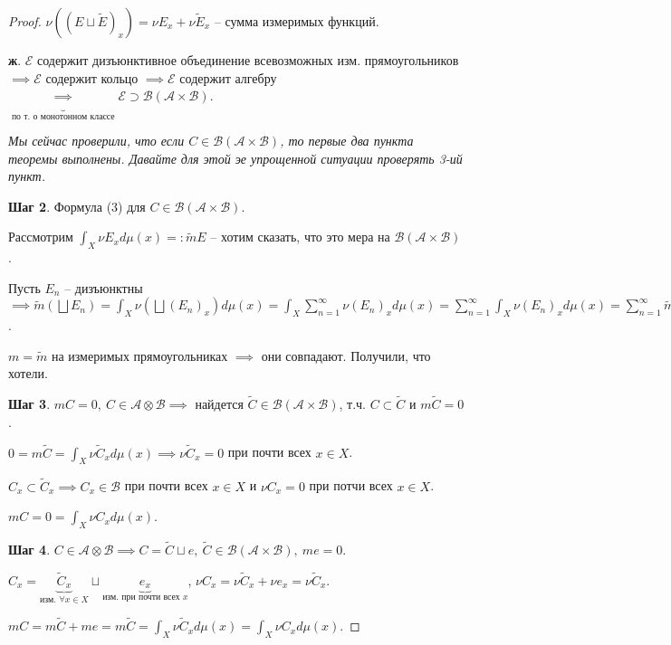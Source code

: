 \begin{proof}
    $\nu \left( (E \sqcup \tilde{E})_x \right) = \nu E_x + \nu \tilde{E}_x$ -- сумма измеримых функций.

    \textbf{ж}. $\mathcal{E}$ содержит дизъюнктивное объединение всевозможных изм. прямоугольников $\implies \mathcal{E}$ содержит кольцо $\implies \mathcal{E}$ содержит алгебру $\underbrace{\implies}_{\text{по т. о монотонном классе}} \mathcal{E} \supset \mathscr{B}(\mathcal{A} \times \mathcal{B})$.

    \textit{Мы сейчас проверили, что если $C \in \mathscr{B}(\mathcal{A} \times \mathcal{B})$, то первые два пункта теоремы выполнены. Давайте для этой эе упрощенной ситуации проверять 3-ий пункт.}
    
    \textbf{Шаг 2}. Формула (3) для $C \in \mathscr{B}(\mathcal{A} \times \mathcal{B})$.

    Рассмотрим $\int_X{\nu E_x d \mu(x) =: \tilde{m} E}$ -- хотим сказать, что это мера на $\mathscr{B}(\mathcal{A} \times \mathcal{B})$.

    Пусть $E_n$ -- дизъюнктны $\implies \tilde{m} (\bigsqcup E_n) = \int_X{\nu \left( \bigsqcup (E_n)_x \right) d \mu(x)} = \int_X {\sum_{n=1}^{\infty} \nu (E_n)_x d \mu(x)} = \sum_{n=1}^{\infty} \int_X {\nu (E_n)_x d \mu(x)} = \sum_{n=1}^{\infty} \tilde{m} E_n$.

    $m = \tilde{m}$ на измеримых прямоугольниках $\implies$ они совпадают.
    Получили, что хотели.

    \textbf{Шаг 3}. $m C = 0, \ C \in \mathcal{A} \otimes \mathcal{B} \implies$ найдется $\tilde{C} \in \mathscr{B} (\mathcal{A} \times \mathcal{B})$, т.ч. $C \subset \tilde{C}$ и $m \tilde{C} = 0$.

    $0 = m \tilde{C} = \int_X {\nu \tilde{C}_x d \mu (x)} \implies \nu \tilde{C}_x = 0$ при почти всех $x \in X$.

    $C_x \subset \tilde{C}_x \implies C_x \in \mathcal{B}$ при почти всех $x \in X$ и $\nu C_x = 0$ при потчи всех $x \in X$.

    $m C = 0 = \int_X {\nu C_x d \mu(x)}$.

    \textbf{Шаг 4}. $C \in \mathcal{A} \otimes \mathcal{B} \implies C = \tilde{C} \sqcup e, \ \tilde{C} \in \mathscr{B} (\mathcal{A} \times \mathcal{B}), \ me = 0$.

    $C_x = \underbrace{\tilde{C}_x}_{\text{изм. } \forall x \in X} \sqcup \underbrace{e_x}_{\text{изм. при почти всех } x}$, $\nu C_x = \nu \tilde{C}_x + \nu e_x = \nu \tilde{C}_x$.

    $m C = m \tilde{C} + m e = m \tilde{C} = \int_X {\nu \tilde{C}_x d \mu (x)} = \int_X {\nu C_x d \mu(x)}$.


\end{proof}
